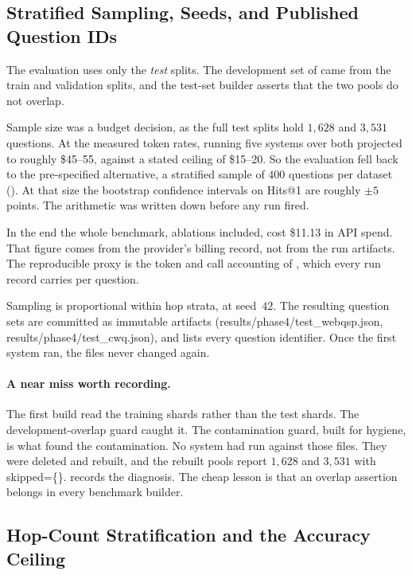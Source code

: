 \subsection{Stratified Sampling, Seeds, and Published Question IDs}

The evaluation uses only the \emph{test} splits. The development set of
 came from the train and validation splits, and the
test-set builder asserts that the two pools do not overlap.

Sample size was a budget decision, as the full test splits hold $1{,}628$ and
$3{,}531$ questions. At the measured token rates, running five systems over both
projected to roughly \$45--55, against a stated ceiling of \$15--20. So the
evaluation fell back to the pre-specified alternative, a stratified sample of
$400$ questions per dataset (). At that size the bootstrap
confidence intervals on Hits@1 are roughly $\pm 5$ points. The arithmetic was
written down before any run fired.

In the end the whole benchmark, ablations included, cost \$11.13 in API spend.
That figure comes from the provider's billing record, not from the run
artifacts. The reproducible proxy is the token and call accounting of
, which every run record carries per question.

Sampling is proportional within hop strata, at seed~$42$. The resulting question
sets are committed as immutable artifacts
(\textsf{results/phase4/test\_webqsp.json},
\textsf{results/phase4/test\_cwq.json}), and  lists every
question identifier. Once the first system ran, the files never changed again.

\paragraph{A near miss worth recording.} The first build read the training
shards rather than the test shards. The development-overlap guard caught it. The
contamination guard, built for hygiene, is what found the contamination. No
system had run against those files. They were deleted and rebuilt, and the
rebuilt pools report $1{,}628$ and $3{,}531$ with \textsf{skipped=\{\}}.
 records the diagnosis. The cheap lesson is that an
overlap assertion belongs in every benchmark builder.

\subsection{Hop-Count Stratification and the Accuracy Ceiling}

